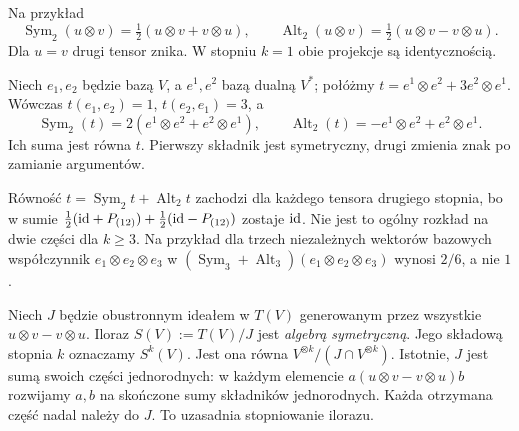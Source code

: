 Na przykład
\[
 \operatorname{Sym}_2(u\otimes v)
 =\tfrac12(u\otimes v+v\otimes u),\qquad
 \operatorname{Alt}_2(u\otimes v)
 =\tfrac12(u\otimes v-v\otimes u).
\]
Dla $u=v$ drugi tensor znika. W stopniu $k=1$ obie
projekcje są identycznością.

\begin{przyklad}
Niech $e_1,e_2$ będzie bazą $V$, a $e^1,e^2$ bazą dualną $V^*$; połóżmy
$t=e^1\otimes e^2+3e^2\otimes e^1$.
Wówczas $t(e_1,e_2)=1$, $t(e_2,e_1)=3$, a
\[
 \operatorname{Sym}_2(t)
 =2(e^1\otimes e^2+e^2\otimes e^1),\qquad
 \operatorname{Alt}_2(t)
 =-e^1\otimes e^2+e^2\otimes e^1.
\]
Ich suma jest równa $t$. Pierwszy składnik jest symetryczny,
drugi zmienia znak po zamianie argumentów.
\end{przyklad}

Równość $t=\operatorname{Sym}_2t+\operatorname{Alt}_2t$
zachodzi dla każdego tensora drugiego stopnia, bo w sumie
$\tfrac12(\mathrm{id}+P_{(12)})+\tfrac12(\mathrm{id}-P_{(12)})$ zostaje $\mathrm{id}$.
Nie jest to ogólny rozkład na dwie części dla $k\geq3$.
Na przykład dla trzech niezależnych wektorów bazowych
współczynnik $e_1\otimes e_2\otimes e_3$ w
$(\operatorname{Sym}_3+\operatorname{Alt}_3)
(e_1\otimes e_2\otimes e_3)$ wynosi $2/6$, a nie $1$.

\begin{definicja}
\label{def:algebra-symetryczna}
Niech $J$ będzie obustronnym ideałem w $T(V)$ generowanym
przez wszystkie $u\otimes v-v\otimes u$. Iloraz
$S(V):=T(V)/J$ jest \emph{algebrą symetryczną}.
Jego składową stopnia $k$ oznaczamy $S^k(V)$.
Jest ona równa $V^{\otimes k}/(J\cap V^{\otimes k})$.
Istotnie, $J$ jest sumą swoich części jednorodnych:
w każdym elemencie $a(u\otimes v-v\otimes u)b$ rozwijamy
$a,b$ na skończone sumy składników jednorodnych. Każda
otrzymana część nadal należy do $J$. To uzasadnia stopniowanie ilorazu.
\end{definicja}


